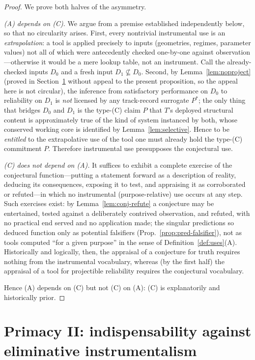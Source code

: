 \documentclass{amsart}
\theoremstyle{definition}
\theoremstyle{plain}
\begin{document}
\begin{proof}
We prove both halves of the asymmetry.

\emph{(A) depends on (C).} We argue from a premise established independently
below, so that no circularity arises. First, every nontrivial instrumental use
is an \emph{extrapolation}: a tool is applied precisely to inputs (geometries,
regimes, parameter values) not all of which were antecedently checked
one-by-one against observation---otherwise it would be a mere lookup table, not
an instrument. Call the already-checked inputs $D_0$ and a fresh input
$D_1\not\subseteq D_0$. Second, by Lemma~\ref{lem:noproject} (proved in
Section~\ref{sec:indisp} without appeal to the present proposition, so the
appeal here is not circular), the inference from satisfactory performance on
$D_0$ to reliability on $D_1$ is \emph{not} licensed by any track-record
surrogate $P^{*}$; the only thing that bridges $D_0$ and $D_1$ is the type-(C)
claim $P$ that $T$'s deployed structural content is approximately true of the
kind of system instanced by both, whose conserved working core is identified by
Lemma~\ref{lem:selective}. Hence to be \emph{entitled} to the extrapolative
use of the tool one must already hold the type-(C) commitment $P$. Therefore
instrumental use presupposes the conjectural use.

\emph{(C) does not depend on (A).} It suffices to exhibit a complete exercise of
the conjectural function---putting a statement forward as a description of
reality, deducing its consequences, exposing it to test, and appraising it as
corroborated or refuted---in which no instrumental (purpose-relative) use occurs
at any step. Such exercises exist: by Lemma~\ref{lem:conj-refute} a conjecture
may be entertained, tested against a deliberately contrived observation, and
refuted, with no practical end served and no application made; the singular
predictions so deduced function only as potential falsifiers
(Prop.~\ref{prop:pred-falsifier}), not as tools computed ``for a given
purpose'' in the sense of Definition~\ref{def:uses}(A). Historically and
logically, then, the appraisal of a conjecture for truth requires nothing from
the instrumental vocabulary, whereas (by the first half) the appraisal of a tool
for projectible reliability requires the conjectural vocabulary.

Hence (A) depends on (C) but not (C) on (A): (C) is explanatorily and
historically prior.
\end{proof}

\section{Primacy II: indispensability against eliminative instrumentalism}\label{sec:indisp}
\end{document}
